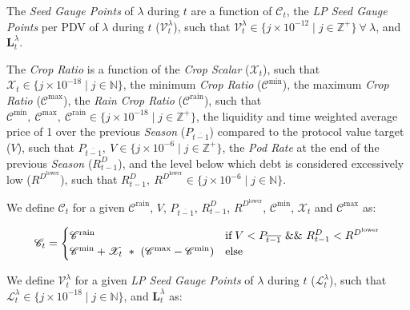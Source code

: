 \documentclass[tikz]{article}
\newcommand{\term}[1]{\textsl{#1}}
\newcommand{\Pinto}{} %
\begin{document}
The \term{Seed Gauge Points} of $\lambda$ during $t$ are a function of $\mathscr{C}_{t}$, the \term{LP Seed Gauge Points} per PDV of $\lambda$ during $t$ ($\mathscr{V}_{t}^{\lambda}$), such that $\mathscr{V}_{t}^{\lambda} \in \{j \times 10^{-12} \mid j \in \mathbb{Z}^{+} \}\ \forall\ \lambda$, and $\mathbf{L}_{t}^{\lambda}$.

\newpage

The \term{Crop Ratio} is a function of the \term{Crop Scalar} ($\mathscr{X}_{t}$), such that $\mathscr{X}_{t} \in \{j \times 10^{-18} \mid j \in \mathbb{N} \}$, the minimum \term{Crop Ratio} ($\mathscr{C}^{\text{min}}$), the maximum \term{Crop Ratio} ($\mathscr{C}^{\text{max}}$), the \term{Rain} \term{Crop Ratio} ($\mathscr{C}^{\text{rain}}$), such that $\mathscr{C}^{\text{min}},\ \mathscr{C}^{\text{max}},\ \mathscr{C}^{\text{rain}} \in \{j \times 10^{-18} \mid j \in \mathbb{Z}^{+} \}$, the liquidity and time weighted average price of \Pinto1 over the previous \term{Season} ($P_{\overline{t-1}}$) compared to the protocol value target ($V$), such that $P_{\overline{t-1}},\ V \in \{j \times 10^{-6} \mid j \in \mathbb{Z}^{+} \}$, the \term{Pod Rate} at the end of the previous \term{Season} ($R_{t-1}^{D}$), and the level below which debt is considered excessively low ($R^{D^{\text{lower}}}$), such that $R_{t-1}^{D},\ R^{D^{\text{lower}}} \in \{j \times 10^{-6} \mid j \in \mathbb{N} \}$.

We define $\mathscr{C}_{t}$ for a given $\mathscr{C}^{\text{rain}}$, $V$, $P_{\overline{t-1}}$, $R_{t-1}^{D}$, $R^{D^{\text{lower}}}$, $\mathscr{C}^{\text{min}}$, $\mathscr{X}_{t}$ and $\mathscr{C}^{\text{max}}$ as:

    $$ 
        \mathscr{C}_{t} = 
        \begin{cases}
            {\mathscr{C}^{\text{rain}}} 
                & \text{if} \; V < P_{\overline{t-1}} \mkern6mu \&\& \mkern6mu R_{t-1}^{D} < R^{D^{\text{lower}}} \\
            
            {\mathscr{C}^{\text{min}} + \mathscr{X}_{t}\ * \ (\mathscr{C}^{\text{max}} - \mathscr{C}^{\text{min}})} 
                & \text{else}
        \end{cases} 
    $$

We define $\mathscr{V}_{t}^{\lambda}$ for a given \term{LP Seed Gauge Points} of $\lambda$ during $t$ ($\mathscr{L}_{t}^{\lambda}$), such that $\mathscr{L}_{t}^{\lambda} \in \{j \times 10^{-18} \mid j \in \mathbb{N} \}$, and $\mathbf{L}_{t}^{\lambda}$ as:
\end{document}
